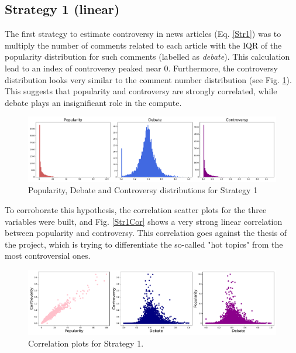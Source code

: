\subsection{Strategy 1 (linear)}
The first strategy to estimate controversy in news articles (Eq. \ref{Str1}) was to multiply the number of comments related to each article with the IQR of the popularity distribution for such comments (labelled as \textit{debate}). This calculation lead to an index of controversy peaked near 0. Furthermore, the controversy distribution looks very similar to the comment number distribution (see Fig. \ref{Str1Dist}). This suggests that popularity and controversy are strongly correlated, while debate plays an insignificant role in the compute. 

\begin{figure}[tb]
\centering
\includegraphics[width=\tw]{Pictures/Strat1Dist.pdf}
\caption{Popularity, Debate and Controversy distributions for Strategy 1}
\label{Str1Dist}
\end{figure}

To corroborate this hypothesis, the correlation scatter plots for the three variables were built, and Fig. \ref{Str1Cor} shows a very strong linear correlation between popularity and controversy. This correlation goes against the thesis of the project, which is trying to differentiate the so-called "hot topics" from the most controversial ones. 

\begin{figure}[tb]
\centering
\includegraphics[width=\tw]{Pictures/Strat1Corr.pdf}
\caption{Correlation plots for Strategy 1.}
\label{Str1Corr}
\end{figure}